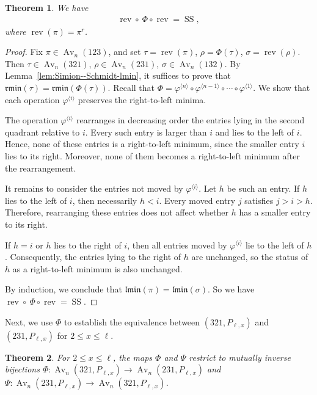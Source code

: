 \documentclass[11pt]{article}
\newtheorem{thm}{Theorem}[section]
\begin{document}
\begin{thm}\label{thm:Phi-Simion--Schmidt} We have
\begin{align*}
\operatorname{rev}\circ\ \Phi\circ\operatorname{rev}
=
\operatorname{SS},
\end{align*}
where $\operatorname{rev}(\pi)=\pi^r$.
\end{thm}

\begin{proof}
Fix $\pi\in\operatorname{Av}_n(123)$, and set
$\tau=\operatorname{rev}(\pi)$,
$\rho=\Phi(\tau)$, $\sigma=\operatorname{rev}(\rho)$.
Then
$\tau\in\operatorname{Av}_n(321)$, $\rho\in\operatorname{Av}_n(231)$,
$\sigma\in\operatorname{Av}_n(132)$.
By Lemma~\ref{lem:Simion--Schmidt-lmin}, it suffices to prove that
$
\mathfrak{rmin}(\tau)=\mathfrak{rmin}(\Phi(\tau))$.
Recall that
$
\Phi
=
\varphi^{\langle n\rangle}\circ
\varphi^{\langle n-1\rangle}\circ\cdots\circ
\varphi^{\langle1\rangle}$.
We show that each operation $\varphi^{\langle i\rangle}$ preserves the
right-to-left minima.

The operation $\varphi^{\langle i\rangle}$ rearranges in decreasing order the entries lying in the second quadrant relative to $i$. Every such entry is larger than $i$ and lies to the left of $i$. Hence, none of these entries is a right-to-left minimum, since the smaller entry $i$ lies to its right. Moreover, none of them becomes a right-to-left minimum after the rearrangement.

It remains to consider the entries not moved by
$\varphi^{\langle i\rangle}$. Let $h$ be such an entry. If $h$ lies to
the left of $i$, then necessarily $h<i$. Every moved entry
$j$ satisfies $j>i>h$.
Therefore, rearranging these entries does not affect whether $h$ has
a smaller entry to its right.

If $h=i$ or $h$ lies to the right of $i$, then all entries moved by
$\varphi^{\langle i\rangle}$ lie to the left of $h$. Consequently, the
entries lying to the right of $h$ are unchanged, so the status of $h$
as a right-to-left minimum is also unchanged.

By induction, we conclude that
$\mathfrak{lmin}(\pi)=\mathfrak{lmin}(\sigma)$.
So we have
$
\operatorname{rev}\circ\ \Phi\circ\operatorname{rev}
=
\operatorname{SS}$.
\end{proof}
Next, we use $\Phi$ to establish the equivalence between
 $(321,P_{\ell,x})$ and $(231,P_{\ell,x})$ for $2\leq x \leq \ell$.

\begin{thm}\label{thm:Phi-Psi-preserve-POP}
For $2\leq x\leq\ell$, the maps $\Phi$ and $\Psi$ restrict to
mutually inverse bijections
$\Phi:
\operatorname{Av}_n(321,P_{\ell,x})
\longrightarrow
\operatorname{Av}_n(231,P_{\ell,x})$
and
$
\Psi:
\operatorname{Av}_n(231,P_{\ell,x})
\longrightarrow
\operatorname{Av}_n(321,P_{\ell,x})$.
\end{thm}
\end{document}
